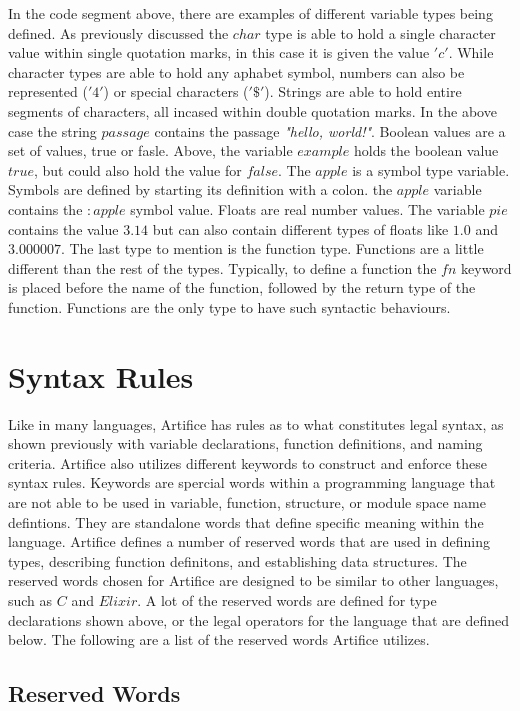 \documentclass{article}
\begin{document}
In the code segment above, there are examples of different variable types being defined. As previously discussed the $char$ type is able to hold a single character value
within single quotation marks, in this case it is given the value $'c'$. While character types are able to hold any aphabet symbol, numbers can also be represented ($'4'$)
or special characters ($'\$'$). Strings are able to hold entire segments of characters, all incased within double quotation marks. In the above case the string $passage$
contains the passage \textit{"hello, world!"}. Boolean values are a set of values, true or fasle. Above, the variable $example$ holds the boolean value $true$, but could also
hold the value for $false$. The $apple$ is a symbol type variable. Symbols are defined by starting its definition with a colon. the $apple$ variable contains the $:apple$
symbol value. Floats are real number values. The variable $pie$ contains the value $3.14$ but can also contain different types of floats like $1.0$ and $3.000007$. The last 
type to mention is the function type. Functions are a little different than the rest of the types. Typically, to define a function the $fn$ keyword is placed before the
name of the function, followed by the return type of the function. Functions are the only type to have such syntactic behaviours.


\section{Syntax Rules}

Like in many languages, Artifice has rules as to what constitutes legal syntax, as shown previously with variable declarations, function definitions, and naming criteria. Artifice
also utilizes different keywords to construct and enforce these syntax rules. Keywords are spercial words within a programming language that are not able to be used in variable,
function, structure, or module space name defintions. They are standalone words that define specific meaning within the language.
Artifice defines a number of reserved words that are used in defining types, describing function definitons, and establishing data structures. The reserved words chosen
for Artifice are designed to be similar to other languages, such as $C$ and $Elixir$. A lot of the reserved words are defined for type declarations shown above, or the legal operators for the 
language that are defined below. The following are a list of the reserved words Artifice utilizes.


\subsection{Reserved Words}
\end{document}
